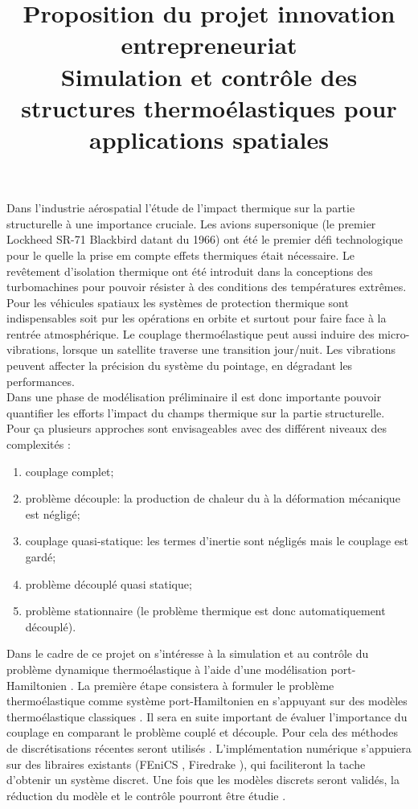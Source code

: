 \documentclass[french]{article}
\begin{document}
\title{Proposition du projet innovation entrepreneuriat \\
Simulation et contrôle des structures thermoélastiques pour applications spatiales}

\maketitle

Dans l'industrie aérospatial l'étude de l'impact thermique sur la partie structurelle à une importance cruciale. Les avions supersonique (le premier Lockheed SR-71 Blackbird datant du 1966)  ont été le premier défi technologique pour le quelle la prise em compte effets thermiques était nécessaire. Le revêtement d'isolation thermique ont été introduit dans la conceptions des turbomachines pour pouvoir résister à des conditions des températures extrêmes. Pour les véhicules spatiaux les systèmes de protection thermique sont indispensables soit pur les opérations en orbite et surtout pour faire face à la rentrée atmosphérique. Le couplage thermoélastique peut aussi induire des micro-vibrations, lorsque un satellite traverse une transition jour/nuit. Les vibrations peuvent affecter la précision du système du pointage, en dégradant les performances. \\

Dans une phase de modélisation préliminaire il est donc importante pouvoir quantifier les efforts l'impact du champs thermique sur la partie structurelle. Pour ça plusieurs approches sont envisageables avec des différent niveaux des complexités \cite{thstress_book}:
\begin{enumerate}
	\item couplage complet;
	\item problème découple: la production de chaleur du à la déformation mécanique est négligé;
	\item couplage quasi-statique: les termes d'inertie sont négligés mais le couplage est gardé;
	\item problème découplé quasi statique;
	\item problème stationnaire (le problème thermique est donc automatiquement découplé).
\end{enumerate}

Dans le cadre de ce projet on s'intéresse à la simulation et au contrôle du problème dynamique thermoélastique à l'aide d'une modélisation port-Hamiltonien \cite{BrugnoliKir,BrugnoliMin,TFMST1,TFMST2}. La première étape consistera à formuler le problème thermoélastique comme système port-Hamiltonien en s'appuyant sur des modèles thermoélastique classiques  \cite{HANSEN1997182,ThTimoshenko,ThLasiecka}. Il sera en suite important de évaluer l'importance du couplage en comparant le problème couplé et découple. Pour cela des méthodes de discrétisations récentes seront utilisés \cite{PFEM}. L'implémentation numérique s'appuiera sur des libraires existants (FEniCS \cite{LoggMardalEtAl2012}, Firedrake \cite{rathgeber2017firedrake}), qui faciliteront la tache d'obtenir un système discret. Une fois que les modèles discrets seront validés, la réduction du modèle et le contrôle pourront être étudie \cite{modred,phAdaptive,pbcontrol}. \\
\end{document}
